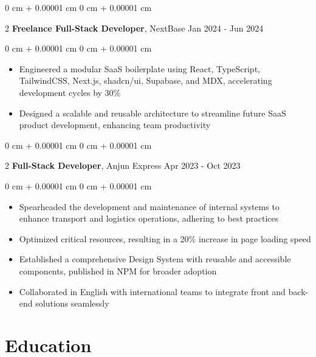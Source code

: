 \documentclass[10pt, letterpaper]{article}
\newenvironment{highlights}{ \begin{itemize}[ topsep=0.10 cm, parsep=0.10 cm, partopsep=0pt,
itemsep=0pt, leftmargin=0 cm + 10pt ] }{ \end{itemize} } %
\newenvironment{onecolentry}{ \begin{adjustwidth}{ 0 cm + 0.00001 cm }{ 0 cm + 0.00001 cm }
}{ \end{adjustwidth} } %
\newenvironment{twocolentry}[2][]{ \onecolentry \def\secondColumn{#2} \setcolumnwidth{\fill, 4.5 cm}
\begin{paracol}{2} }{ \switchcolumn \raggedleft \secondColumn \end{paracol}
\endonecolentry } %
\begin{document}
	\vspace{0.2 cm}

	\begin{twocolentry}
		{ Jan 2024 - Jun 2024 } \textbf{Freelance Full-Stack Developer}, NextBase
	\end{twocolentry}

	\vspace{0.10 cm}
	\begin{onecolentry}
		\begin{highlights}
			\item Engineered a modular SaaS boilerplate using React, TypeScript, TailwindCSS, Next.js, shadcn/ui, Supabase, and MDX, accelerating development cycles by 30\%
			\item Designed a scalable and reusable architecture to streamline future SaaS product development, enhancing team productivity
		\end{highlights}
	\end{onecolentry}

	\vspace{0.2 cm}

	\begin{twocolentry}
		{ Apr 2023 - Oct 2023 } \textbf{Full-Stack Developer}, Anjun Express
	\end{twocolentry}

	\vspace{0.10 cm}
	\begin{onecolentry}
		\begin{highlights}
			\item Spearheaded the development and maintenance of internal systems to enhance transport and logistics operations, adhering to best practices
			\item Optimized critical resources, resulting in a 20\% increase in page loading speed
			\item Established a comprehensive Design System with reusable and accessible components, published in NPM for broader adoption
			\item Collaborated in English with international teams to integrate front and back-end solutions seamlessly
		\end{highlights}
	\end{onecolentry}

	\section{Education}
\end{document}
